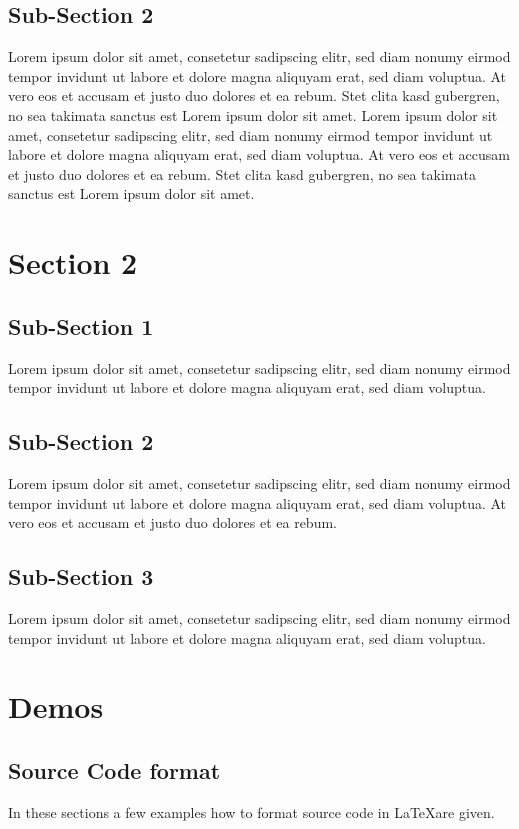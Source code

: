 \documentclass[12pt,a4paper,titlepage,oneside]{scrartcl}
\begin{document}
\subsection{Sub-Section 2}
Lorem ipsum dolor sit amet, consetetur sadipscing elitr, sed diam nonumy eirmod tempor invidunt ut labore et dolore magna aliquyam erat, sed diam voluptua. At vero eos et accusam et justo duo dolores et ea rebum. Stet clita kasd gubergren, no sea takimata sanctus est Lorem ipsum dolor sit amet. Lorem ipsum dolor sit amet, consetetur sadipscing elitr, sed diam nonumy eirmod tempor invidunt ut labore et dolore magna aliquyam erat, sed diam voluptua. At vero eos et accusam et justo duo dolores et ea rebum. Stet clita kasd gubergren, no sea takimata sanctus est Lorem ipsum dolor sit amet.

\section{Section 2}

\subsection{Sub-Section 1}
Lorem ipsum dolor sit amet, consetetur sadipscing elitr, sed diam nonumy eirmod tempor invidunt ut labore et dolore magna aliquyam erat, sed diam voluptua. 

\subsection{Sub-Section 2}
Lorem ipsum dolor sit amet, consetetur sadipscing elitr, sed diam nonumy eirmod tempor invidunt ut labore et dolore magna aliquyam erat, sed diam voluptua. At vero eos et accusam et justo duo dolores et ea rebum. 

\subsection{Sub-Section 3}
Lorem ipsum dolor sit amet, consetetur sadipscing elitr, sed diam nonumy eirmod tempor invidunt ut labore et dolore magna aliquyam erat, sed diam voluptua. 

\section{Demos}

\subsection{Source Code format}
In these sections a few examples how to format source code in \LaTeX are given.
\end{document}
